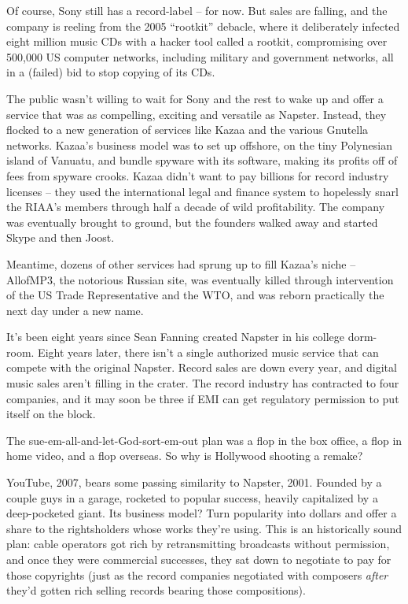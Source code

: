 Of course, Sony still has a record-label -- for now. But sales are
falling, and the company is reeling from the 2005 ``rootkit''
debacle, where it deliberately infected eight million music CDs
with a hacker tool called a rootkit, compromising over 500,000 US
computer networks, including military and government networks, all
in a (failed) bid to stop copying of its CDs.

The public wasn't willing to wait for Sony and the rest to wake up
and offer a service that was as compelling, exciting and versatile
as Napster. Instead, they flocked to a new generation of services
like Kazaa and the various Gnutella networks. Kazaa's business
model was to set up offshore, on the tiny Polynesian island of
Vanuatu, and bundle spyware with its software, making its profits
off of fees from spyware crooks. Kazaa didn't want to pay billions
for record industry licenses -- they used the international legal
and finance system to hopelessly snarl the RIAA's members through
half a decade of wild profitability. The company was eventually
brought to ground, but the founders walked away and started Skype
and then Joost.

Meantime, dozens of other services had sprung up to fill Kazaa's
niche -- AllofMP3, the notorious Russian site, was eventually
killed through intervention of the US Trade Representative and the
WTO, and was reborn practically the next day under a new name.

It's been eight years since Sean Fanning created Napster in his
college dorm-room. Eight years later, there isn't a single
authorized music service that can compete with the original
Napster. Record sales are down every year, and digital music sales
aren't filling in the crater. The record industry has contracted to
four companies, and it may soon be three if EMI can get regulatory
permission to put itself on the block.

The sue-em-all-and-let-God-sort-em-out plan was a flop in the box
office, a flop in home video, and a flop overseas. So why is
Hollywood shooting a remake?

\bigskip

YouTube, 2007, bears some passing similarity to Napster, 2001.
Founded by a couple guys in a garage, rocketed to popular success,
heavily capitalized by a deep-pocketed giant. Its business model?
Turn popularity into dollars and offer a share to the rightsholders
whose works they're using. This is an historically sound plan:
cable operators got rich by retransmitting broadcasts without
permission, and once they were commercial successes, they sat down
to negotiate to pay for those copyrights (just as the record
companies negotiated with composers \emph{after} they'd gotten
rich selling records bearing those compositions).

